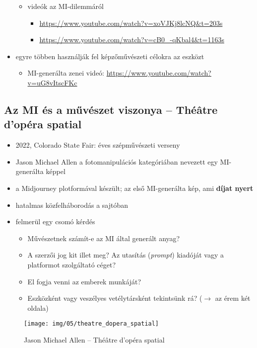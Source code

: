 \documentclass[a4paper, 11pt]{article}
\begin{document}
\begin{itemize}
\begin{itemize}
\begin{itemize}
		\end{itemize}
		\item videók az MI-dilemmáról
		\begin{itemize}
			\item \url{https://www.youtube.com/watch?v=xoVJKj8lcNQ&t=203s}
			\item \url{https://www.youtube.com/watch?v=cB0_-qKbal4&t=1163s}
		\end{itemize}
	\end{itemize}
	\item egyre többen használják fel képzőművészeti célokra az eszközt
	\begin{itemize}
		\item MI-generálta zenei videó: \url{https://www.youtube.com/watch?v=uG8vItscFKc}
	\end{itemize}
\end{itemize}

\subsection{Az MI és a művészet viszonya -- Thé\^atre d'opéra spatial}

\begin{itemize}
	\item 2022, Colorado State Fair: éves szépművészeti verseny
	\item Jason Michael Allen a fotomanipulációs kategóriában nevezett egy MI-generálta képpel
	\item a Midjourney plotformával készült; az első MI-generálta kép, ami \textbf{díjat nyert}
	\item hatalmas közfelháborodás a sajtóban
	\item felmerül egy csomó kérdés
	\begin{itemize}
		\item Művészetnek számít-e az MI által generált anyag?
		\item A szerzői jog kit illet meg? Az utasítás (\textit{prompt}) kiadóját vagy a platformot szolgáltató céget?
		\item El fogja venni az emberek munkáját?
		\item Eszközként vagy veszélyes vetélytársként tekintsünk rá? ($\to$ az érem két oldala)
	\end{itemize}
\end{itemize}

\begin{figure}[h!]
	\centering
	\texttt{[image: img/05/theatre\_dopera\_spatial]}
	\caption{Jason Michael Allen -- Thé\^atre d'opéra spatial}
\end{figure}
\end{document}
